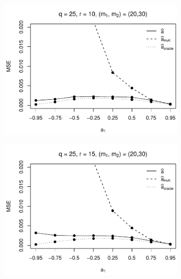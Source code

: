 \begin{figure}[p]
\begin{subfigure}[b]{0.45\textwidth}
\includegraphics[width=\textwidth]{Plots/Robustness/MSE_a1_zoomed_T=500_slope=10_(q,K1,K2,M1,M2)=(25,2,10,20,30).pdf}
\end{subfigure}
\hspace{0.25cm}
\begin{subfigure}[b]{0.45\textwidth}
\includegraphics[width=\textwidth]{Plots/Robustness/MSE_a1_zoomed_T=500_slope=10_(q,K1,K2,M1,M2)=(25,2,15,20,30).pdf}
\end{subfigure}


\end{figure}
